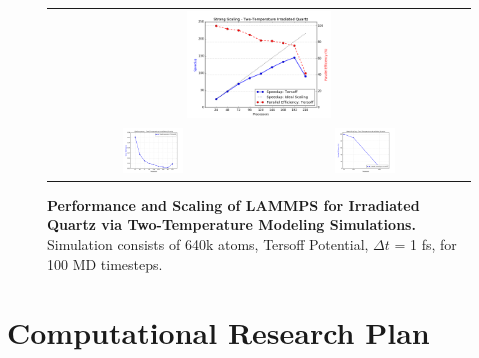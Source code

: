 \documentclass{proposalnsf}
\begin{document}
\begin{figure}[H]
  \begin{center}
      \begin{tabular}{cc}
    \multicolumn{2}{c}{\includegraphics[width=0.35\textwidth]{graphics/comet_strong_twoTemp.png}} \\
    \includegraphics[width=0.3\textwidth]{graphics/comet_perf_twoTemp.png} &
    \includegraphics[width=0.3\textwidth]{graphics/comet_weak_twoTemp.png} \\
    \end{tabular}
    
  \caption{\textbf{Performance and Scaling of LAMMPS for Irradiated Quartz via Two-Temperature Modeling Simulations.} Simulation consists of 640k atoms, Tersoff Potential, $\Delta t$ = 1 fs, for 100 MD timesteps.}\label{scaling_twoTemp}
  
  \end{center}
\end{figure}

\section*{Computational Research Plan}
\end{document}
